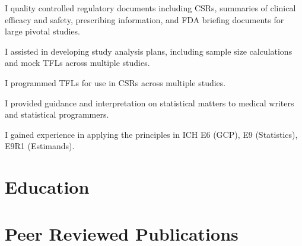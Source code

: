 \documentclass[11pt,a4paper,]{awesome-cv}
\begin{document}
\begin{cventries}
{\begin{cvitems}
\item I quality controlled regulatory documents including CSRs, summaries of clinical efficacy and safety, prescribing information, and FDA briefing documents for large pivotal studies.
\item I assisted in developing study analysis plans, including sample size calculations and mock TFLs across multiple studies.
\item I programmed TFLs for use in CSRs across multiple studies.
\item I provided guidance and interpretation on statistical matters to medical writers and statistical programmers.
\item I gained experience in applying the principles in ICH E6 (GCP), E9 (Statistics), E9R1 (Estimands).
\end{cvitems}}
\end{cventries}

\hypertarget{education}{%
\section{Education}\label{education}}

\begin{cventries}
    \vspace{-4.0mm}
\end{cventries}

\hypertarget{peer-reviewed-publications}{%
\section{Peer Reviewed Publications}\label{peer-reviewed-publications}}
\end{document}
